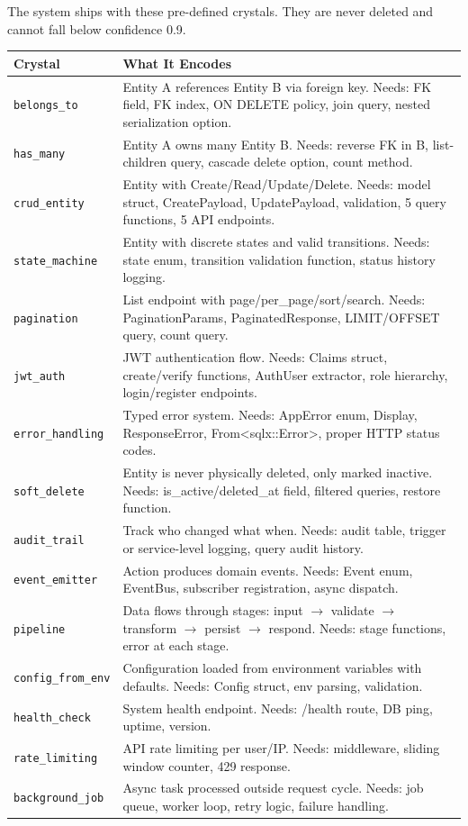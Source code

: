 \documentclass[11pt,a4paper]{article}
\begin{document}
The system ships with these pre-defined crystals. They are never
deleted and cannot fall below confidence 0.9.

\begin{center}
\small
\begin{tabular}{lp{8cm}}
\toprule
\textbf{Crystal} & \textbf{What It Encodes} \\
\midrule
\texttt{belongs\_to} & Entity A references Entity B via foreign key. Needs: FK field,
  FK index, ON DELETE policy, join query, nested serialization option. \\
\texttt{has\_many} & Entity A owns many Entity B. Needs: reverse FK in B,
  list-children query, cascade delete option, count method. \\
\texttt{crud\_entity} & Entity with Create/Read/Update/Delete. Needs: model struct,
  CreatePayload, UpdatePayload, validation, 5 query functions, 5 API endpoints. \\
\texttt{state\_machine} & Entity with discrete states and valid transitions. Needs:
  state enum, transition validation function, status history logging. \\
\texttt{pagination} & List endpoint with page/per\_page/sort/search. Needs:
  PaginationParams, PaginatedResponse, LIMIT/OFFSET query, count query. \\
\texttt{jwt\_auth} & JWT authentication flow. Needs: Claims struct, create/verify
  functions, AuthUser extractor, role hierarchy, login/register endpoints. \\
\texttt{error\_handling} & Typed error system. Needs: AppError enum, Display,
  ResponseError, From<sqlx::Error>, proper HTTP status codes. \\
\texttt{soft\_delete} & Entity is never physically deleted, only marked inactive.
  Needs: is\_active/deleted\_at field, filtered queries, restore function. \\
\texttt{audit\_trail} & Track who changed what when. Needs: audit table, trigger
  or service-level logging, query audit history. \\
\texttt{event\_emitter} & Action produces domain events. Needs: Event enum,
  EventBus, subscriber registration, async dispatch. \\
\texttt{pipeline} & Data flows through stages: input $\to$ validate $\to$ transform
  $\to$ persist $\to$ respond. Needs: stage functions, error at each stage. \\
\texttt{config\_from\_env} & Configuration loaded from environment variables with
  defaults. Needs: Config struct, env parsing, validation. \\
\texttt{health\_check} & System health endpoint. Needs: /health route, DB ping,
  uptime, version. \\
\texttt{rate\_limiting} & API rate limiting per user/IP. Needs: middleware,
  sliding window counter, 429 response. \\
\texttt{background\_job} & Async task processed outside request cycle. Needs:
  job queue, worker loop, retry logic, failure handling. \\
\bottomrule
\end{tabular}
\end{center}
\end{document}
